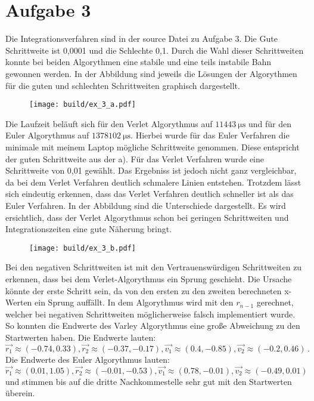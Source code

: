 \section*{Aufgabe 3}
Die Integrationsverfahren sind in der source Datei zu Aufgabe 3. 
Die Gute Schrittweite ist 0,0001 und die Schlechte 0,1.
Durch die Wahl dieser Schrittweiten konnte bei beiden Algorythmen eine stabile und eine teils instabile Bahn gewonnen werden.
In der Abbildung sind jeweils die Lösungen der Algorythmen für die guten und schlechten Schrittweiten graphisch dargestellt.
\begin{figure}
    \centering
    \texttt{[image: build/ex\_3\_a.pdf]}
\end{figure}

\FloatBarrier

Die Laufzeit beläuft sich für den Verlet Algorythmus auf
$\SI{11443}{\micro\second}$ und für den Euler Algorythmus auf $\SI{1378102}{\micro\second}$.
Hierbei wurde für das Euler Verfahren die minimale mit meinem Laptop mögliche Schrittweite genommen. Diese entspricht der guten Schrittweite aus der a). Für das Verlet Verfahren wurde eine Schrittweite von
0,01 gewählt.
Das Ergebniss ist jedoch nicht ganz vergleichbar, da bei dem Verlet Verfahren deutlich schmalere Linien entstehen.
Trotzdem lässt sich eindeutig erkennen, dass das Verlet Verfahren deutlich schneller ist als das Euler Verfahren.
In der Abbildung sind die Unterschiede dargestellt. Es wird ersichtlich, dass der Verlet Algorythmus schon bei geringen Schrittweiten und Integrationszeiten eine gute Näherung bringt.
\begin{figure}
    \centering
    \texttt{[image: build/ex\_3\_b.pdf]}
\end{figure}
\FloatBarrier

Bei den negativen Schrittweiten ist mit den Vertrauenswürdigen Schrittweiten zu erkennen, dass bei dem Verlet-Algorythmus ein Sprung geschieht.
Die Ursache könnte der erste Schritt sein, da von den ersten zu den zweiten berechneten x-Werten ein Sprung auffällt.
In dem Algorythmus wird mit den $r_{n-1 }$ gerechnet, welcher bei negativen Schrittweiten möglicherweise falsch implementiert wurde.
So konnten die Endwerte des Varley Algorythmus eine große Abweichung zu den Startwerten haben.
Die Endwerte lauten:
\begin{equation}
    \vec{r_1} \approx (-0.74, 0.33), \vec{r_2} \approx (-0.37, -0.17), \vec{v_1} \approx (0.4, -0.85), \vec{v_2} \approx (-0.2, 0.46) \, .
\end{equation}
Die Endwerte des Euler Algorythmus lauten:
\begin{equation}
    \vec{r_1} \approx (0.01, 1.05), \vec{r_2} \approx (-0.01, -0.53), \vec{v_1} \approx (0.78, -0.01), \vec{v_2} \approx (-0.49, 0.01)
\end{equation}
und stimmen bis auf die dritte Nachkommestelle sehr gut mit den Startwerten überein.


